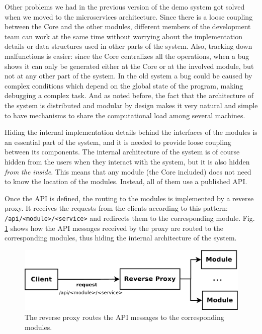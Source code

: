 Other problems we had in the previous version of the demo system got solved when we moved to the microservices architecture. Since there is a loose coupling between the Core and the other modules, different members of the development team can work at the same time without worrying about the implementation details or data structures used in other parts of the system. Also, tracking down malfunctions is easier: since the Core centralizes all the operations, when a bug shows it can only be generated either at the Core or at the involved module, but not at any other part of the system. In the old system a bug could be caused by complex conditions which depend on the global state of the program, making debugging a complex task. And as noted before, the fact that the architecture of the system is distributed and modular by design makes it very natural and simple to have mechanisms to share the computational load among several machines.

Hiding the internal implementation details behind the interfaces of the modules is an essential part of the system, and it is needed to provide loose coupling between its components. The internal architecture of the system is of course hidden from the users when they interact with the system, but it is also hidden \emph{from the inside}. This means that any module (the Core included) does not need to know the location of the modules. Instead, all of them use a published API.

Once the API is defined, the routing to the modules is implemented by a reverse proxy. It receives the requests from the clients according to this pattern: \verb|/api/<module>/<service>| and redirects them to the corresponding module. Fig. \ref{fig:reverse_proxy} shows how the API messages received by the proxy are routed to the corresponding modules, thus hiding the internal architecture of the system.

\begin{figure}[!ht]
    \centering
    \includegraphics[width=0.8\columnwidth]{proxy/images/reverse_proxy.pdf}
    \caption{The reverse proxy routes the API messages to the corresponding modules.}
    \label{fig:reverse_proxy}
\end{figure}

